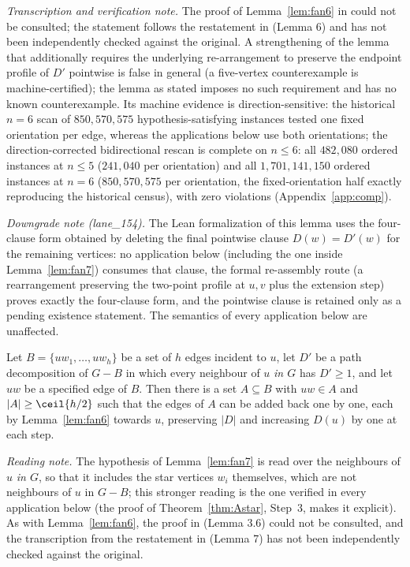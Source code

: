 \emph{Transcription and verification note.} The proof of Lemma~\ref{lem:fan6} in \cite{Fan05}
could not be consulted; the statement follows the restatement in \cite{BS21} (Lemma 6) and has
not been independently checked against the original. A strengthening of the lemma that
additionally requires the underlying re-arrangement to preserve the endpoint profile of $D'$
pointwise is false in general (a five-vertex counterexample is machine-certified); the lemma as
stated imposes no such requirement and has no known counterexample. Its machine evidence is
direction-sensitive: the historical $n=6$ scan of $850{,}570{,}575$ hypothesis-satisfying
instances tested one fixed orientation per edge, whereas the applications below use both
orientations; the direction-corrected bidirectional rescan is complete on $n\le6$: all
$482{,}080$ ordered instances at $n\le5$ ($241{,}040$ per orientation) and all
$1{,}701{,}141{,}150$ ordered instances at $n=6$ ($850{,}570{,}575$ per orientation, the
fixed-orientation half exactly reproducing the historical census), with zero violations
(Appendix~\ref{app:comp}).

\emph{Downgrade note (lane\_154).} The Lean formalization of this lemma uses the four-clause
form obtained by deleting the final pointwise clause $D(w)=D'(w)$ for the remaining vertices:
no application below (including the one inside Lemma~\ref{lem:fan7}) consumes that clause, the
formal re-assembly route (a rearrangement preserving the two-point profile at $u,v$ plus the
extension step) proves exactly the four-clause form, and the pointwise clause is retained only
as a pending existence statement. The semantics of every application below are unaffected.

\begin{lemma}\label{lem:fan7}
Let $B=\{uw_1,\dots,uw_h\}$ be a set of $h$ edges incident to $u$, let $D'$ be a path
decomposition of $G-B$ in which every neighbour of $u$ \emph{in $G$} has $D'\ge 1$, and let
$uw$ be a specified edge of $B$. Then there is a set $A\subseteq B$ with $uw\in A$ and
$|A|\ge\ceil{h/2}$ such that the edges of $A$ can be added back one by one, each by
Lemma~\ref{lem:fan6} towards $u$, preserving $|D|$ and increasing $D(u)$ by one at each step.
\end{lemma}

\emph{Reading note.} The hypothesis of Lemma~\ref{lem:fan7} is read over the neighbours of $u$
\emph{in $G$}, so that it includes the star vertices $w_i$ themselves, which are not
neighbours of $u$ in $G-B$; this stronger reading is the one verified in every application
below (the proof of Theorem~\ref{thm:Astar}, Step~3, makes it explicit). As with
Lemma~\ref{lem:fan6}, the proof in \cite{Fan05} (Lemma 3.6) could not be consulted, and the
transcription from the restatement in \cite{BS21} (Lemma 7) has not been independently checked
against the original.

